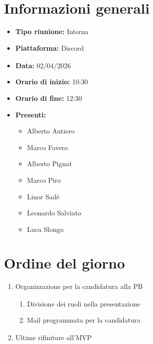 \documentclass[a4paper,12pt]{article}
\begin{document}
\newpage

\tableofcontents
\newpage

\section{Informazioni generali}

\begin{itemize}
    \item \textbf{Tipo riunione:} Interna
    \item \textbf{Piattaforma:} Discord\textsubscript{}
    \item \textbf{Data:} 02/04/2026
    \item \textbf{Orario di inizio:} 10:30
    \item \textbf{Orario di fine:} 12:30
    \item \textbf{Presenti:}
    \begin{itemize}[leftmargin=1.5em, itemsep=3pt, label={\rule[0.5ex]{0.4em}{0.4em}}]
        \item Alberto Autiero
        \item Marco Favero
        \item Alberto Pignat
        \item Marco Piro
        \item Linor Sadè
        \item Leonardo Salviato
        \item Luca Slongo
    \end{itemize}
\end{itemize}

\section{Ordine del giorno}
\begin{enumerate}
    \item\label{itm:organizzazione_candidatura} Organizzazione per la candidatura\textsubscript{} alla PB\textsubscript{}
    \begin{enumerate}
      \item\label{itm:ppt-cardin} Divisione dei ruoli nella presentazione
      \item\label{itm:invio-mail} Mail programmata per la candidatura\textsubscript{}
    \end{enumerate}
    \item\label{itm:discussione_requisiti} Ultime rifiniture all'MVP\textsubscript{}
\end{enumerate}
\end{document}
